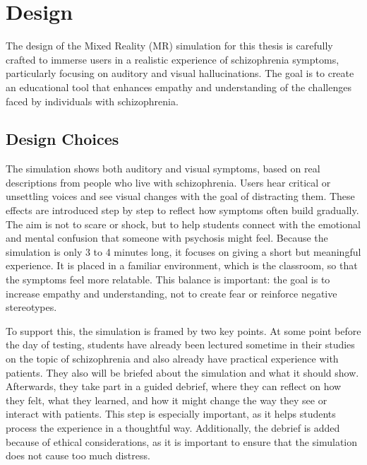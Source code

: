 \chapter{Design}
\label{ch:design}

The design of the Mixed Reality (MR) simulation for this thesis is carefully crafted to immerse users in a realistic experience of schizophrenia symptoms, particularly focusing on auditory and visual hallucinations. The goal is to create an educational tool that enhances empathy and understanding of the challenges faced by individuals with schizophrenia.

\section{Design Choices}


The simulation shows both auditory and visual symptoms, based on real descriptions from people who live with schizophrenia. Users hear critical or unsettling voices and see visual changes with the goal of distracting them. These effects are introduced step by step to reflect how symptoms often build gradually. The aim is not to scare or shock, but to help students connect with the emotional and mental confusion that someone with psychosis might feel. Because the simulation is only 3 to 4 minutes long, it focuses on giving a short but meaningful experience. It is placed in a familiar environment, which is the classroom, so that the symptoms feel more relatable. This balance is important: the goal is to increase empathy and understanding, not to create fear or reinforce negative stereotypes. %

\vspace{1em}

To support this, the simulation is framed by two key points. At some point before the day of testing, students have already been lectured sometime in their studies on the topic of schizophrenia and also already have practical experience with patients. They also will be briefed about the simulation and what it should show. Afterwards, they take part in a guided debrief, where they can reflect on how they felt, what they learned, and how it might change the way they see or interact with patients. This step is especially important, as it helps students process the experience in a thoughtful way. Additionally, the debrief is added because of ethical considerations, as it is important to ensure that the simulation does not cause too much distress.

